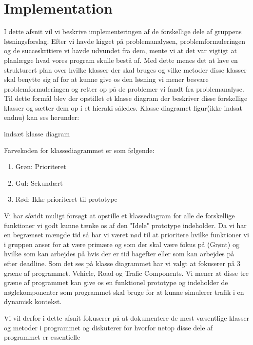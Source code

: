 \usepackage{listing}
\chapter{Implementation}\label{Implementation}

I dette afsnit vil vi beskrive implementeringen af de forskellige dele af gruppens løsningsforslag. Efter vi havde kigget på problemanalysen, problemformuleringen og de succeskritiere vi havde udvundet fra dem, mente vi at det var vigtigt at planlægge hvad vores program skulle bestå af. Med dette menes det at lave en strukturert plan over hvilke klasser der skal bruges og vilke metoder disse klasser skal benytte sig af for at kunne give os den løsning vi mener besvare problemformuleringen og retter op på de problemer vi fandt fra problemanalyse. Til dette formål blev der opstillet et klasse diagram der beskriver disse forskellige klasser og sætter dem op i et hieraki således. Klasse diagramet figur(ikke indsat endnu) kan ses herunder:

{indsæt klasse diagram}

Farvekoden for klassediagrammet er som følgende:

\begin{enumerate}
\item Grøn: Prioriteret
\item Gul: Sekundært
\item Rød: Ikke prioriteret til prototype
\end{enumerate}

Vi har såvidt muligt forsøgt at opstille et klassediagram for alle de forskellige funktioner vi godt kunne tænke os af den "Idele" prototype indeholder. Da vi har en begrænset mængde tid så har vi været nød til at prioritere hvilke funktioner vi i gruppen anser for at være primære og som der skal være fokus på (Grønt) og hvilke som kan arbejdes på hvis der er tid bagefter eller som kan arbejdes på efter deadline. Som det ses på klasse diagrammet har vi valgt at fokuserer på 3 græne af programmet. Vehicle, Road og Trafic Components. Vi mener at disse tre græne af programmet kan give os en funktionel prototype og indeholder de nøglekomponenter som programmet skal bruge for at kunne simulerer trafik i en dynamisk kontekst.

Vi vil derfor i dette afsnit fokuserer på at dokumentere de mest væsentlige klasser og metoder i programmet og diskuterer for hvorfor netop disse dele af programmet er essentielle

